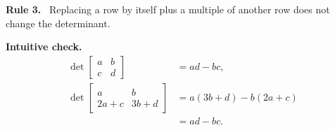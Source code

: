 \documentclass[letterpaper]{article}
\newcommand{\noteheader}[1]{\par\medskip\noindent\textbf{#1}\ }
\begin{document}
\noteheader{Rule 3.} Replacing a row by itself plus a multiple of another row does not change the determinant.

\noteheader{Intuitive check.}
\begin{align*}
\det\begin{bmatrix}a&b\\c&d\end{bmatrix}
&=ad-bc,\\
\det\begin{bmatrix}a&b\\2a+c&3b+d\end{bmatrix}
&=a(3b+d)-b(2a+c)\\
&=ad-bc.
\end{align*}
\end{document}
